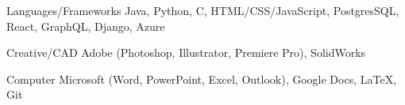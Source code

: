 
\begin{cvskills}
  \cvskill
  {Languages/Frameworks} %
  {Java, Python, C, HTML/CSS/JavaScript, PostgresSQL, React, GraphQL, Django, Azure} %

  \cvskill
  {Creative/CAD} %
  {Adobe (Photoshop, Illustrator, Premiere Pro), SolidWorks} %

  \cvskill
  {Computer} %
  {Microsoft (Word, PowerPoint, Excel, Outlook), Google Docs, LaTeX, Git} %
\end{cvskills}
